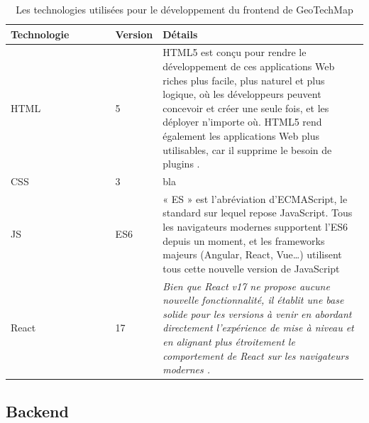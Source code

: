         \begin{table}
                \centering
                \begin{tabular}{|p{0.30\linewidth}|p{0.10\linewidth}|p{0.60\linewidth}|}
                \hline
                        \textbf{Technologie}&\textbf{Version}&\textbf{Détails}\\
                        \hline
                        HTML&
                        5&
                        HTML5 est conçu pour rendre le développement de ces applications Web 
                        riches plus facile, plus naturel et plus logique, où les développeurs 
                        peuvent concevoir et créer une seule fois, et les déployer n'importe où. 
                        HTML5 rend également les applications Web plus utilisables, car il supprime 
                        le besoin de plugins \cite{wang2013definitive}.
                        \\
                        \hline
                        CSS&
                        3&
                        bla
                        \\
                        \hline
                        JS&
                        ES6&
                        « ES » est l’abréviation d’ECMAScript, le standard sur lequel repose JavaScript.
                        Tous les navigateurs modernes supportent l’ES6 depuis un moment, et les 
                        frameworks majeurs (Angular, React, Vue…) utilisent tous cette nouvelle version de JavaScript
                        \\
                        \hline
                        React&
                        17&
                        \textit{Bien que React v17 ne propose aucune nouvelle fonctionnalité, 
                        il établit une base solide pour les versions à venir en abordant directement 
                        l'expérience de mise à niveau et en alignant plus étroitement le comportement 
                        de React sur les navigateurs modernes \cite{Vardhan2020}.}
                        \\
                        \hline
                      
                \end{tabular}
                \caption{Les technologies utilisées pour le développement du frontend de GeoTechMap} 
                \label{tab:techoFrontend}
        \end{table}
        \par
        \subsection{Backend}

